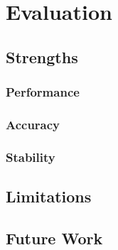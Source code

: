 
\chapter{Evaluation}\label{chapter:evaluation}

\section{Strengths}

\subsection{Performance}
\subsection{Accuracy}
\subsection{Stability}


\section{Limitations}

\section{Future Work}
